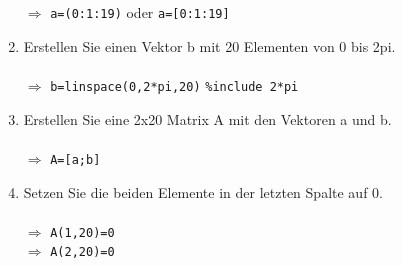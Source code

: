 \begin{enumerate}[$(a)$]
\\\\
$\Longrightarrow$ {\color{magenta}\texttt{a=(0:1:19)}} oder {\color{magenta}\texttt{a=[0:1:19]}}
\item Erstellen Sie einen Vektor b mit 20 Elementen von 0 bis 2pi.
\\\\
$\Longrightarrow$ {\color{magenta}\texttt{b=linspace(0,2*pi,20)}} \texttt{\%include 2*pi}
\item Erstellen Sie eine 2x20 Matrix A mit den Vektoren a und b.
\\\\
$\Longrightarrow$ {\color{magenta}\texttt{A=[a;b]}}
\item Setzen Sie die beiden Elemente in der letzten Spalte auf 0.
\\\\
$\Longrightarrow$ {\color{magenta}\texttt{A(1,20)=0}}
\\
$\Longrightarrow$ {\color{magenta}\texttt{A(2,20)=0}}
\end{enumerate}
